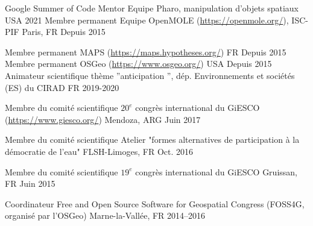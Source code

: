 

\begin{cvhonors}

  \cvhonor
    {Google Summer of Code Mentor} %
    {Equipe Pharo, manipulation d'objets spatiaux} %
    {USA} %
    {2021} %
    \cvhonor
      {Membre permanent} %
      {Equipe OpenMOLE (\url{https://openmole.org/}), ISC-PIF} %
      {Paris, FR} %
      {Depuis 2015} %

    \cvhonor
      {Membre permanent} %
      {MAPS (\url{https://maps.hypotheses.org/})} %
      {FR} %
      {Depuis 2015} %
    \cvhonor
      {Membre permanent} %
      {OSGeo (\url{https://www.osgeo.org/})} %
      {USA} %
      {Depuis 2015} %
  \cvhonor
    {Animateur scientifique} %
    {thème ”anticipation ”, dép. Environnements et sociétés (ES) du CIRAD} %
    {FR} %
    {2019-2020} %

  \cvhonor
    {Membre du comité scientifique} %
    {$20^{e}$ congrès international du GiESCO (\url{https://www.giesco.org/})} %
    {Mendoza, ARG} %
    {Juin 2017} %

  \cvhonor
    {Membre du comité scientifique} %
    {Atelier "formes alternatives de participation à la démocratie de l'eau"} %
    {FLSH-Limoges, FR} %
    {Oct. 2016} %

  \cvhonor
    {Membre du comité scientifique} %
    {$19^{e}$ congrès international du GiESCO} %
    {Gruissan, FR} %
    {Juin 2015} %

\cvhonor
  {Coordinateur} %
  {Free and Open Source Software for Geospatial Congress (FOSS4G, organisé par l'OSGeo)} %
  {Marne-la-Vallée, FR} %
  {2014--2016} %

\end{cvhonors}
